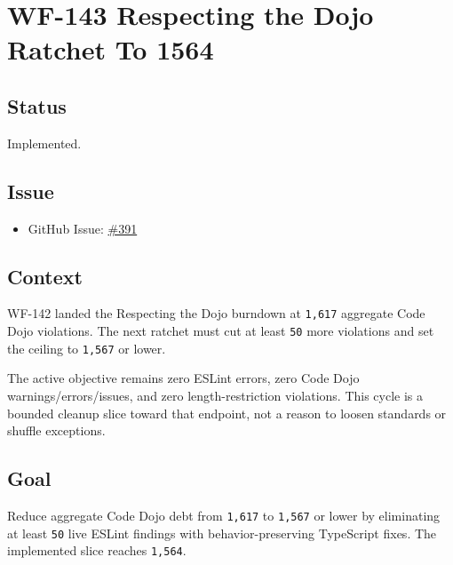 \chapter{WF-143 Respecting the Dojo Ratchet To 1564}\label{record-225}

\smallskip

\section{Status}\label{record-225-status}

Implemented.

\section{Issue}\label{record-225-issue}

\begin{itemize}
\tightlist
\item
  GitHub Issue: \href{https://github.com/flyingrobots/bijou/issues/391}{\#391}
\end{itemize}

\section{Context}\label{record-225-context}

WF-142 landed the Respecting the Dojo burndown at \texttt{1\allowbreak{},\allowbreak{}6\allowbreak{}1\allowbreak{}7} aggregate Code Dojo violations. The next ratchet must cut at least \texttt{5\allowbreak{}0} more violations and set the ceiling to \texttt{1\allowbreak{},\allowbreak{}5\allowbreak{}6\allowbreak{}7} or lower.

The active objective remains zero ESLint errors, zero Code Dojo warnings/errors/issues, and zero length-restriction violations. This cycle is a bounded cleanup slice toward that endpoint, not a reason to loosen standards or shuffle exceptions.

\section{Goal}\label{record-225-goal}

Reduce aggregate Code Dojo debt from \texttt{1\allowbreak{},\allowbreak{}6\allowbreak{}1\allowbreak{}7} to \texttt{1\allowbreak{},\allowbreak{}5\allowbreak{}6\allowbreak{}7} or lower by eliminating at least \texttt{5\allowbreak{}0} live ESLint findings with behavior-preserving TypeScript fixes. The implemented slice reaches \texttt{1\allowbreak{},\allowbreak{}5\allowbreak{}6\allowbreak{}4}.

